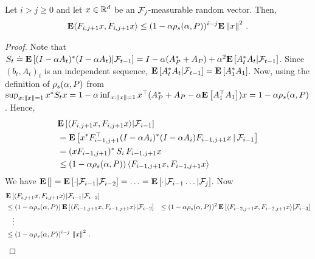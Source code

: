 \begin{lemma}\label{innerproduct}
Let $i>j \ge 0$ and let $x\in \mathbb{R}^d$ be an $\mathcal{F}_j$-measurable random vector.
Then,
\begin{align*}
\mathbf{E}\langle F_{i,j+1}x,F_{i,j+1}x\rangle\leq (1-\alpha \rho_s(\alpha,P))^{i-j}\mathbf{E}\left\| x\right\|^2\,.
\end{align*}
\end{lemma}
\begin{proof}
Note that
$S_t\doteq \mathbf{E}\left[ (I-\alpha A_t)^* (I-\alpha A_t) | \mathcal{F}_{t-1} \right]
= I - \alpha (A_P^* + A_P) + \alpha^2 \mathbf{E}\left[ A_t^* A_t | \mathcal{F}_{t-1} \right]$.
Since $(b_t,A_t)_t$ is an independent sequence, $\mathbf{E}\left[ A_t^* A_t|\mathcal{F}_{t-1}\right] = \mathbf{E}\left[ A_1^* A_1 \right]$.
Now, using the definition of $\rho_s(\alpha,P)$ from 
$\sup_{x:\left\| x\right\|= 1} x^* S_t x = 1 - \alpha \inf_{x:\left\| x\right\|=1} x^\top (A_P^* + A_P - \alpha \mathbf{E}\left[A_1^\top A_1\right]) x
= 1-\alpha \rho_s(\alpha,P)$.
Hence,
\begin{align*}
&\mathbf{E}\left[\langle F_{i,j+1}x,F_{i,j+1}x\rangle|\mathcal{F}_{i-1} \right]\\
&= \mathbf{E}\left[x^* F_{i-1,j+1}^\top (I-\alpha A_i)^* (I-\alpha A_i) F_{i-1,j+1} x\,|\,\mathcal{F}_{i-1}\right]\\
&=(x F_{i-1,j+1})^* \, S_i \, F_{i-1,j+1} x\\
&\le (1-\alpha \rho_s(\alpha,P)) \, \langle F_{i-1,j+1} x, F_{i-1,j+1} x\rangle
\end{align*}
We have $\mathbf{E}\left[\right]=\mathbf{E}\left[\cdot|\mathcal{F}_{i-1}|\mathcal{F}_{i-2}\right]=\ldots=\mathbf{E}\left[\cdot|\mathcal{F}_{i-1}\ldots |\mathcal{F}_{j}\right]$. Now
\begin{align*}
&\mathbf{E}\left[\langle F_{i,j+1}x,F_{i,j+1}x\rangle|\mathcal{F}_{i-1} |\mathcal{F}_{i-2}\right]\\
&\le (1-\alpha \rho_s(\alpha,P)) \, \mathbf{E}\left[\langle F_{i-1,j+1} x, F_{i-1,j+1} x\rangle|\mathcal{F}_{i-2}\right]
& \le (1-\alpha \rho_s(\alpha,P))^2\, \mathbf{E}\left[\langle F_{i-2,j+1} x, F_{i-2,j+1} x\rangle |\mathcal{F}_{i-3}\right]\\
& \quad \vdots \\
& \le (1-\alpha \rho_s(\alpha,P))^{i-j}\, \left\| x\right\|^2\,.
\end{align*}
\end{proof}



